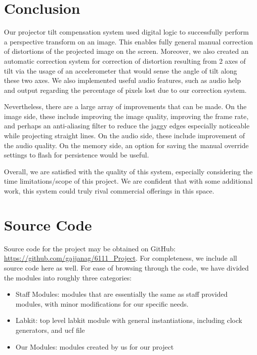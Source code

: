 \documentclass{article}
\begin{document}
\section{Conclusion}
Our projector tilt compensation system used digital logic to successfully perform a perspective transform on an image.
This enables fully general manual correction of distortions of the projected image on the screen.
Moreover, we also created an automatic correction system for correction of distortion resulting from 2 axes of tilt
via the usage of an accelerometer that would sense the angle of tilt along these two axes.
We also implemented useful audio features, such as audio help and output regarding the percentage of pixels lost
due to our correction system.

Nevertheless, there are a large array of improvements that can be made.
On the image side, these include improving the image quality, improving the frame rate,
and perhaps an anti-aliasing filter to reduce the jaggy edges especially noticeable while projecting straight lines.
On the audio side, these include improvement of the audio quality.
On the memory side, an option for saving the manual override settings to flash for persistence would be useful.

Overall, we are satisfied with the quality of this system,
especially considering the time limitations/scope of this project.
We are confident that with some additional work,
this system could truly rival commercial offerings in this space.



\newpage

\appendix

\section{Source Code}
Source code for the project may be obtained on GitHub: \url{https://github.com/gajjanag/6111_Project}.
For completeness, we include all source code here as well.
For ease of browsing through the code, we have divided the modules into roughly three categories:
\begin{itemize}
\item Staff Modules: modules that are essentially the same as staff provided modules, with minor modifications for our specific needs.
\item Labkit: top level labkit module with general instantiations, including clock generators, and ucf file
\item Our Modules: modules created by us for our project
\end{itemize}
\end{document}
